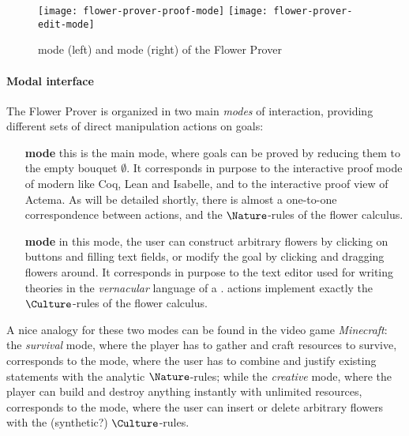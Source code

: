 \begin{figure*}
  \texttt{[image: flower-prover-proof-mode]}
  \hspace{1em}
  \texttt{[image: flower-prover-edit-mode]}
  \caption{\Proof mode (left) and \Edit mode (right) of the Flower Prover}
\end{figure*}

\paragraph{Modal interface}

The Flower Prover is organized in two main \emph{modes} of interaction,
providing different sets of direct manipulation actions on
goals:
\begin{itemize}
  \item[\textbf{\Proof mode}] this is the main mode, where goals can be proved by
  reducing them to the empty bouquet $\emptyset$. It corresponds in purpose to
  the interactive proof mode of modern  like Coq, Lean and
  Isabelle, and to the interactive proof view of Actema.
  As will be detailed shortly, there is almost a one-to-one correspondence
  between \Proof actions, and the $\Nature$-rules of the flower calculus.
  
  \item[\textbf{\Edit mode}] in this mode, the user can construct arbitrary
  flowers by clicking on buttons and filling text fields, or modify the goal by
  clicking and dragging flowers around. It corresponds in purpose to the text
  editor used for writing theories in the \emph{vernacular} language of a . \Edit actions implement exactly the
  $\Culture$-rules of the flower calculus.
\end{itemize}

\begin{remark}
  A nice analogy for these two modes can be found in the video game
  \emph{Minecraft}: the \emph{survival} mode, where the player has to gather and
  craft resources to survive, corresponds to the \Proof mode, where the user has
  to combine and justify existing statements with the analytic $\Nature$-rules;
  while the \emph{creative} mode, where the player can build and destroy
  anything instantly with unlimited resources, corresponds to the \Edit mode,
  where the user can insert or delete arbitrary flowers with the (synthetic?)
  $\Culture$-rules.
\end{remark}


